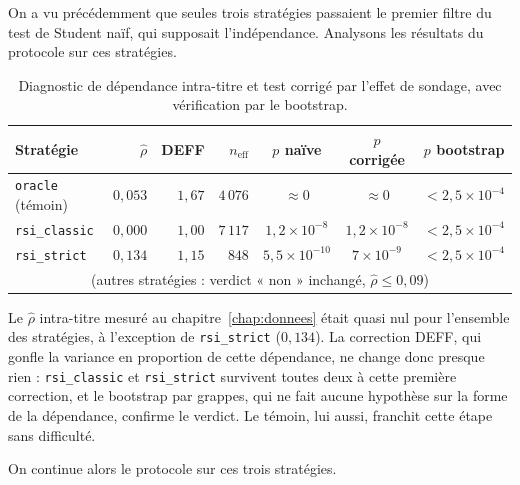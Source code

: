 On a vu précédemment que seules trois stratégies passaient le premier filtre
du test de Student naïf, qui supposait l'indépendance. Analysons les résultats
du protocole sur ces stratégies.

\begin{table}[H]
\centering
\caption{Diagnostic de dépendance intra-titre et test corrigé par l'effet de
sondage, avec vérification par le bootstrap.}
\label{tab:b1-dep-deff}
\small
\begin{tabular}{@{}lrrrccc@{}}
\toprule
Stratégie & $\hat\rho$ & DEFF & $n_{\text{eff}}$ & $p$ naïve & $p$ corrigée & $p$ bootstrap \\
\midrule
\texttt{oracle} (témoin) & $0{,}053$ & $1{,}67$ & $4\,076$ & $\approx 0$ & $\approx 0$ & $<2{,}5\times10^{-4}$ \\
\midrule
\texttt{rsi\_classic} & $0{,}000$ & $1{,}00$ & $7\,117$ & $1{,}2\times10^{-8}$ & $1{,}2\times10^{-8}$ & $<2{,}5\times10^{-4}$ \\
\texttt{rsi\_strict}  & $0{,}134$ & $1{,}15$ & $848$    & $5{,}5\times10^{-10}$ & $7\times10^{-9}$     & $<2{,}5\times10^{-4}$ \\
\multicolumn{7}{c}{\footnotesize (autres stratégies : verdict « non » inchangé, $\hat\rho \le 0{,}09$)} \\
\bottomrule
\end{tabular}
\end{table}

Le $\hat\rho$ intra-titre mesuré au chapitre~\ref{chap:donnees} était quasi nul
pour l'ensemble des stratégies, à l'exception de \texttt{rsi\_strict}
($0{,}134$). La correction DEFF, qui gonfle la variance en proportion de
cette dépendance, ne change donc presque rien : \texttt{rsi\_classic} et
\texttt{rsi\_strict} survivent toutes deux à cette première correction, et le
bootstrap par grappes, qui ne fait aucune hypothèse sur la forme de la
dépendance, confirme le verdict. Le témoin, lui aussi, franchit cette étape
sans difficulté.

On continue alors le protocole sur ces trois stratégies.

